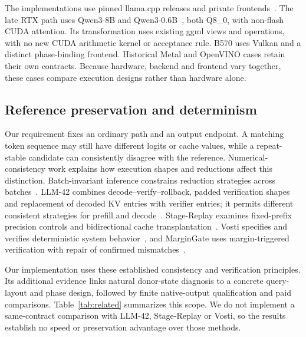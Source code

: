The implementations use pinned llama.cpp releases and private frontends~\cite{llamacpp}. The late RTX path uses Qwen3-8B and Qwen3-0.6B~\cite{qwen3}, both Q8\_0, with non-flash CUDA attention. Its transformation uses existing ggml views and operations, with no new CUDA arithmetic kernel or acceptance rule. B570 uses Vulkan and a distinct phase-binding frontend. Historical Metal and OpenVINO cases retain their own contracts. Because hardware, backend and frontend vary together, these cases compare execution designs rather than hardware alone.

\subsection{Reference preservation and determinism}
Our requirement fixes an ordinary path and an output endpoint. A matching token sequence may still have different logits or cache values, while a repeat-stable candidate can consistently disagree with the reference. Numerical-consistency work explains how execution shapes and reductions affect this distinction. Batch-invariant inference constrains reduction strategies across batches~\cite{thinkingmachines}. LLM-42 combines decode--verify--rollback, padded verification shapes and replacement of decoded KV entries with verifier entries; it permits different consistent strategies for prefill and decode~\cite{llm42}. Stage-Replay examines fixed-prefix precision controls and bidirectional cache transplantation~\cite{stagereplay}. Vosti specifies and verifies deterministic system behavior~\cite{vosti}, and MarginGate uses margin-triggered verification with repair of confirmed mismatches~\cite{margingate}.

Our implementation uses these established consistency and verification principles. Its additional evidence links natural donor-state diagnosis to a concrete query-layout and phase design, followed by finite native-output qualification and paid comparisons. Table~\ref{tab:related} summarizes this scope. We do not implement a same-contract comparison with LLM-42, Stage-Replay or Vosti, so the results establish no speed or preservation advantage over those methods.

